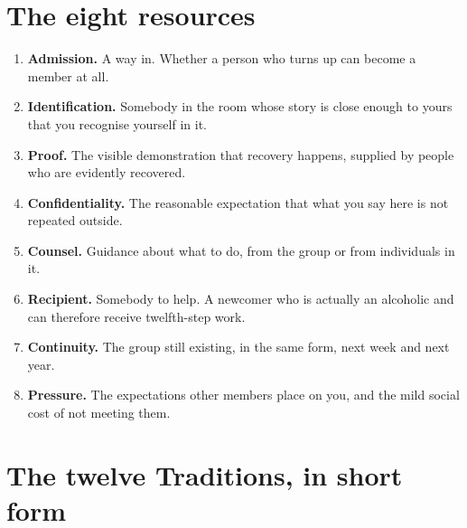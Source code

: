 \documentclass[11pt]{article}
\begin{document}
\section{The eight resources}

\begin{enumerate}[leftmargin=*,itemsep=2pt]
\item \textbf{Admission.} A way in. Whether a person who turns up can become a member at all.
\item \textbf{Identification.} Somebody in the room whose story is close enough to yours that you
      recognise yourself in it.
\item \textbf{Proof.} The visible demonstration that recovery happens, supplied by people who are
      evidently recovered.
\item \textbf{Confidentiality.} The reasonable expectation that what you say here is not repeated
      outside.
\item \textbf{Counsel.} Guidance about what to do, from the group or from individuals in it.
\item \textbf{Recipient.} Somebody to help. A newcomer who is actually an alcoholic and can
      therefore receive twelfth-step work.
\item \textbf{Continuity.} The group still existing, in the same form, next week and next year.
\item \textbf{Pressure.} The expectations other members place on you, and the mild social cost of
      not meeting them.
\end{enumerate}

\section{The twelve Traditions, in short form}
\end{document}
